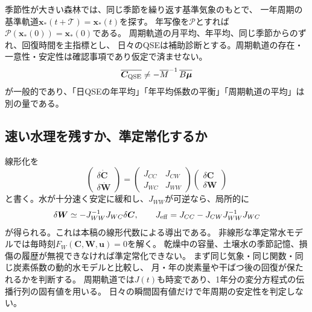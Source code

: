 \documentclass[a4paper,11pt]{ltjsarticle}
\begin{document}
季節性が大きい森林では、同じ季節を繰り返す基準気象のもとで、
一年周期の基準軌道$\bm x_*(t+\mathcal T)=\bm x_*(t)$を探す。
年写像を$\mathcal P$とすれば$\mathcal P(\bm x_*(0))=\bm x_*(0)$である。
周期軌道の月平均、年平均、同じ季節からのずれ、回復時間を主指標とし、
日々のQSEは補助診断とする。周期軌道の存在・一意性・安定性は確認事項であり仮定で済ませない。
\begin{equation}
\overline{\bm C_{\rm QSE}}\ne
-\overline M^{-1}\,\overline{B\bm\mu}
\end{equation}
が一般的であり、「日QSEの年平均」「年平均係数の平衡」「周期軌道の平均」は別の量である。

\subsection{速い水理を残すか、準定常化するか}
線形化を
\begin{equation}
\begin{pmatrix}\delta\dot{\bm C}\\\delta\dot{\bm W}\end{pmatrix}
=\begin{pmatrix}J_{CC}&J_{CW}\\J_{WC}&J_{WW}\end{pmatrix}
\begin{pmatrix}\delta\bm C\\\delta\bm W\end{pmatrix}
\end{equation}
と書く。水が十分速く安定に緩和し、$J_{WW}$が可逆なら、局所的に
\begin{equation}
\delta\bm W\simeq-J_{WW}^{-1}J_{WC}\delta\bm C,
\qquad J_{\rm eff}=J_{CC}-J_{CW}J_{WW}^{-1}J_{WC}
\end{equation}
が得られる。これは本稿の線形代数による導出である。
非線形な準定常水モデルでは毎時刻$F_W(\bm C,\bm W,\bm u)=0$を解く。
乾燥中の容量、土壌水の季節記憶、損傷の履歴が無視できなければ準定常化できない。
まず同じ気象・同じ関数・同じ炭素係数の動的水モデルと比較し、
月・年の炭素量や干ばつ後の回復が保たれるかを判断する。
周期軌道では$J(t)$も時変であり、1年分の変分方程式の伝播行列の固有値を用いる。
日々の瞬間固有値だけで年周期の安定性を判定しない。
\end{document}
